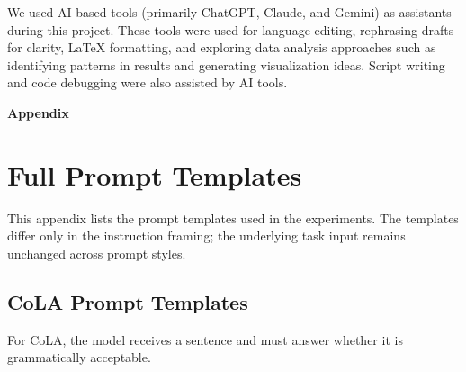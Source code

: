 \documentclass[11pt]{article}
\begin{document}
We used AI-based tools (primarily ChatGPT, Claude, and Gemini) as assistants during this project. These tools were used for language editing, rephrasing drafts for clarity, LaTeX formatting, and exploring data analysis approaches such as identifying patterns in results and generating visualization ideas. Script writing and code debugging were also assisted by AI tools.




\clearpage
\onecolumn
\appendix
\setcounter{section}{0}

\begin{center}
{\Large \textbf{Appendix}}
\end{center}
\vspace{1em}

\section{Full Prompt Templates}
\label{app:prompts}

This appendix lists the prompt templates used in the experiments. The templates differ only in the instruction framing; the underlying task input remains unchanged across prompt styles.

\subsection{CoLA Prompt Templates}

For CoLA, the model receives a sentence and must answer whether it is grammatically acceptable.
\end{document}

